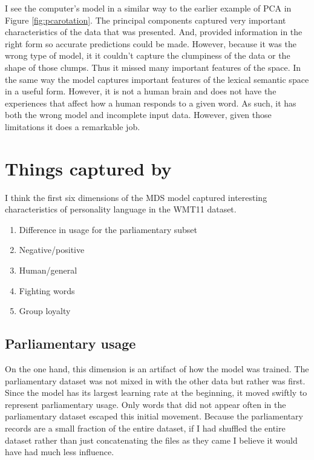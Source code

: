 I see the computer's model in a similar way to the earlier example of PCA in 
Figure \ref{fig:pcarotation}. The principal components captured very important
characteristics of the data that was presented. And, provided information in 
the right 
form so accurate predictions could be made. However, because it was the wrong
type of model, it it couldn't capture the clumpiness of the data or the 
shape of those clumps. Thus it missed many important features of the space. In 
the same way
the \modelname{} model captures important features of the lexical semantic space
in a useful form. However, it is not a human brain and does not have the 
experiences that affect how a human responds to a given word. As such, it has
both the wrong model and incomplete input data. However, given those limitations
it does a remarkable job.

\section{Things captured by \modelname{}}

I think the first six dimensions of the MDS \modelname{} model captured
 interesting characteristics of personality language in the WMT11 dataset.
%
\begin{enumerate}
 \item Difference in usage for the parliamentary subset
 \item Negative/positive
 \item Human/general
 \item Fighting words
 \item Group loyalty
\end{enumerate}

\subsection{Parliamentary usage}

On the one hand, this dimension is an artifact of how the model was trained.
The parliamentary dataset was not mixed in with the other data but rather was
first. Since the model has its largest learning rate at the beginning, it moved
swiftly to represent parliamentary usage. Only words that did not appear often
in the parliamentary dataset escaped this initial movement. Because the 
parliamentary records are a small fraction of the entire dataset, if I had 
shuffled the entire dataset rather than just concatenating the files as they 
came I believe it would have had much less influence.

